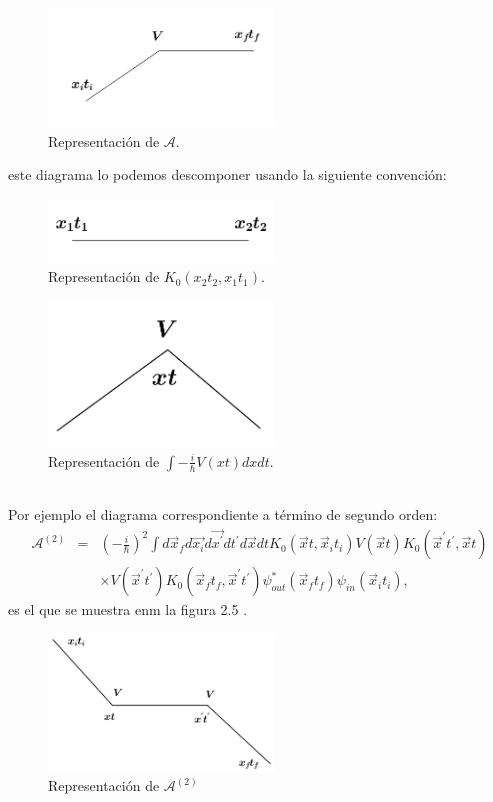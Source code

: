 \begin{figure}
\caption[Diagrama de Feynmann primera cuantización]{Representación de $\mathcal{A}$.}
\includegraphics[width=6cm]{Imagenes/Fig2}
\end{figure}
este diagrama lo podemos descomponer usando la siguiente convención:
\begin{figure}
\caption[Diagrama de Feynmann primera cuantización]{Representación de $K_0(x_2t_2,x_1t_1)$.}
\includegraphics[width=6cm]{Imagenes/Fig3}
\end{figure}
\begin{figure}
\caption[Diagrama de Feynmann primera cuantización]{Representación de $\int -\frac{i}{\hbar}V(xt)dxdt$.}
\includegraphics[width=6cm]{Imagenes/Fig4}
\end{figure}
\\
Por ejemplo el diagrama correspondiente a término de segundo orden:
\begin{eqnarray}
\nonumber \mathcal{A}^{(2)}&=&\left(-\frac{i}{\hbar}\right)^2\int d\vec{x}_{f}d\vec{x_{i}}d\vec{x^{\prime}}dt^{\prime} d\vec{x}dtK_{0}(\vec{x}t,\vec{x}_it_i)V(\vec{x}t)K_{0}(\vec{x}^{\prime} t^{\prime},\vec{x}t)\\
&&\times V(\vec{x}^{\prime} t^{\prime})K_{0}(\vec{x}_{f}t_{f},\vec{x}^{\prime} t^{\prime})\psi_{out}^{*}(\vec{x}_{f}t_{f})\psi_{in}(\vec{x}_{i}t_{i}),
\end{eqnarray}
es el que se muestra enm la figura 2.5 .
\begin{figure}
\caption[Diagrama de Feynmann primera cuantización]{Representación de $\mathcal{A}^{(2)}$}
\includegraphics[width=6cm]{Imagenes/Fig5}
\end{figure}

